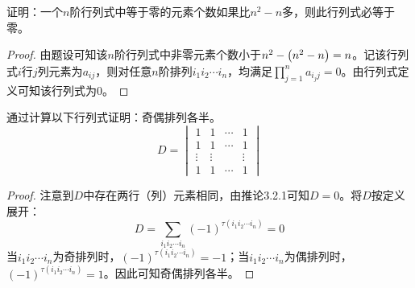 \begin{problem}
证明：一个\(n\)阶行列式中等于零的元素个数如果比\(n^2-n\)多，则此行列式必等于零。
\end{problem}
\begin{proof}
    由题设可知该\(n\)阶行列式中非零元素个数小于\(n^2-\left( n^2-n \right)=n\)。记该行列式\(i\)行\(j\)列元素为\(a_{ij}\)，则对任意\(n\)阶排列\(i_1i_2\cdots i_n\)，均满足\(\prod_{j=1}^{n}a_{i_jj}=0\)。由行列式定义可知该行列式为\(0\)。
\end{proof}

\begin{problem}
通过计算以下行列式证明：奇偶排列各半。
\begin{equation*}
    D=
    \begin{vmatrix}
        1      & 1      & \cdots & 1      \\
        1      & 1      & \cdots & 1      \\
        \vdots & \vdots &        & \vdots \\
        1      & 1      & \cdots & 1
    \end{vmatrix}
\end{equation*}
\end{problem}
\begin{proof}
    注意到\(D\)中存在两行（列）元素相同，由推论3.2.1可知\(D=0\)。将\(D\)按定义展开：
    \begin{equation*}
        D=\sum_{i_1i_2\cdots i_n}(-1)^{\tau(i_1i_2\cdots i_n)}=0
    \end{equation*}
    当\(i_1i_2\cdots i_n\)为奇排列时，\((-1)^{\tau(i_1i_2\cdots i_n)}=-1\)；当\(i_1i_2\cdots i_n\)为偶排列时，\((-1)^{\tau(i_1i_2\cdots i_n)}=1\)。因此可知奇偶排列各半。
\end{proof}


